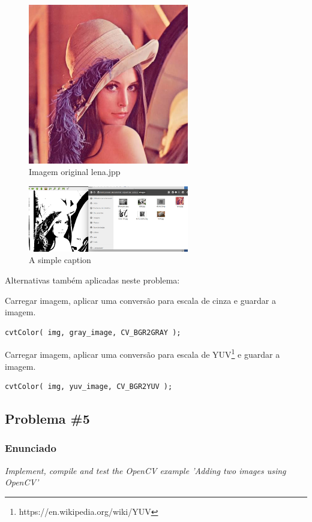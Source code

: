 \documentclass[portuguese, times, mirror]{revdetua}
\begin{document}
\begin{figure}[ht!]
\centering
\includegraphics[width=70mm]{img/lena.jpg}
\caption{Imagem original lena.jpp}
\end{figure}



\begin{figure}[ht!]
\centering
\includegraphics[width=70mm]{img/ex1.png}
\caption{A simple caption \label{overflow}}
\end{figure}


Alternativas também aplicadas neste problema: 

Carregar imagem, aplicar uma conversão para escala de cinza e guardar a imagem. 
\begin{lstlisting}
cvtColor( img, gray_image, CV_BGR2GRAY );
\end{lstlisting}

Carregar imagem, aplicar uma conversão para escala de YUV\footnote{https://en.wikipedia.org/wiki/YUV}  e guardar a imagem. 

\begin{lstlisting}
cvtColor( img, yuv_image, CV_BGR2YUV );
\end{lstlisting}




\subsection{Problema \#5}

\subsubsection{Enunciado}
\textit{ Implement, compile and test the OpenCV example 'Adding two images using OpenCV'}
\end{document}

